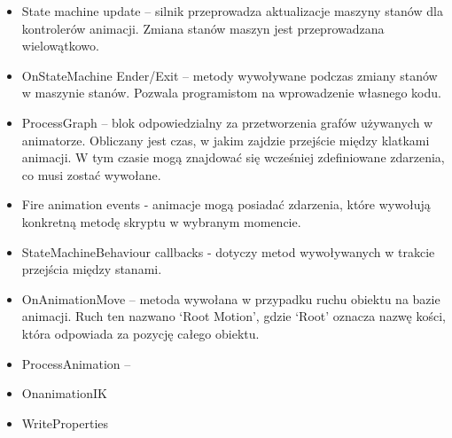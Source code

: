 \documentclass[12pt,twoside]{article}
\begin{document}
\begin{itemize}
\item State machine update – silnik przeprowadza aktualizacje maszyny stanów dla
kontrolerów animacji. Zmiana stanów maszyn jest przeprowadzana wielowątkowo. 
\item OnStateMachine Ender/Exit – metody wywoływane podczas zmiany stanów w
maszynie stanów. Pozwala programistom na wprowadzenie własnego kodu.
\item ProcessGraph – blok odpowiedzialny za przetworzenia grafów używanych w
animatorze. Obliczany jest czas, w jakim zajdzie przejście między klatkami
animacji. W tym czasie mogą znajdować się wcześniej zdefiniowane zdarzenia, co
musi zostać wywołane. 
\item Fire animation events - animacje mogą posiadać zdarzenia, które wywołują
konkretną metodę skryptu w wybranym momencie. 
\item StateMachineBehaviour callbacks - dotyczy metod wywoływanych w trakcie
przejścia między stanami. 
\item OnAnimationMove – metoda wywołana w przypadku ruchu obiektu na bazie
animacji. Ruch ten nazwano ‘Root Motion’, gdzie ‘Root’ oznacza nazwę kości,
która odpowiada za pozycję całego obiektu.  
\item ProcessAnimation –
\item OnanimationIK
\item WriteProperties
\end{itemize}
\end{document}
